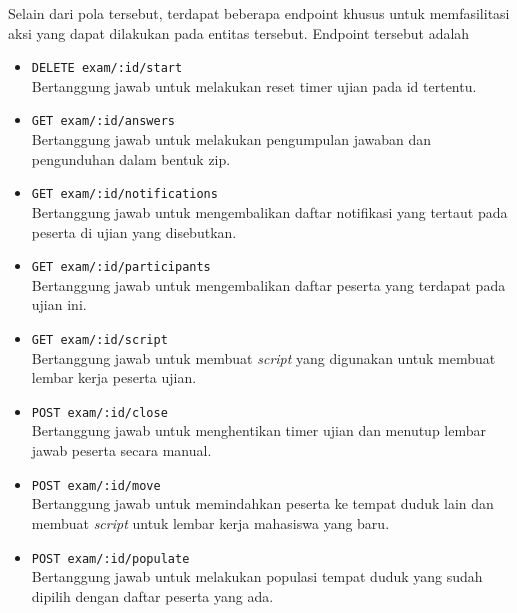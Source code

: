     Selain dari pola tersebut, terdapat beberapa endpoint khusus untuk
    memfasilitasi aksi yang dapat dilakukan pada entitas tersebut. Endpoint
    tersebut adalah
    \begin{itemize}
        \item \texttt{DELETE exam/:id/start} \\
            Bertanggung jawab untuk melakukan reset timer ujian pada id
            tertentu.
            
        \item \texttt{GET exam/:id/answers} \\
            Bertanggung jawab untuk melakukan pengumpulan jawaban dan
            pengunduhan dalam bentuk zip.
            
        \item \texttt{GET exam/:id/notifications} \\
            Bertanggung jawab untuk mengembalikan daftar notifikasi yang tertaut
            pada peserta di ujian yang disebutkan.
            
        \item \texttt{GET exam/:id/participants} \\
            Bertanggung jawab untuk mengembalikan daftar peserta yang terdapat
            pada ujian ini.
            
        \item \texttt{GET exam/:id/script} \\
            Bertanggung jawab untuk membuat \textit{script} yang digunakan untuk
            membuat lembar kerja peserta ujian.
            
        \item \texttt{POST exam/:id/close} \\
            Bertanggung jawab untuk menghentikan timer ujian dan menutup lembar
            jawab peserta secara manual.
            
        \item \texttt{POST exam/:id/move} \\
            Bertanggung jawab untuk memindahkan peserta ke tempat duduk lain dan
            membuat \textit{script} untuk lembar kerja mahasiswa yang baru.
            
        \item \texttt{POST exam/:id/populate} \\
            Bertanggung jawab untuk melakukan populasi tempat duduk yang sudah
            dipilih dengan daftar peserta yang ada.
            

\end{itemize}
